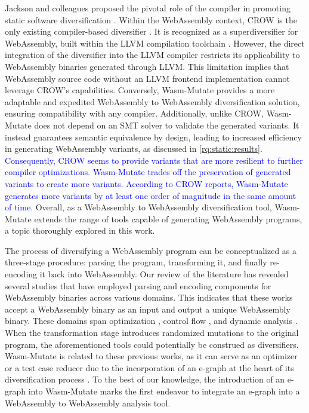 \documentclass[a4paper,fleqn]{cas-dc}
\newcommand{\tool}{{\sc Wasm-Mutate}\xspace}
\newcommand{\Wasm}{WebAssembly\xspace}
\newcommand{\wasm}{\Wasm}
\newcommand{\revision}[1]{\textcolor{blue}{#1}}
\begin{document}
Jackson and colleagues proposed the pivotal role of the compiler in promoting static software diversification \cite{jackson2011compiler}.
Within the \wasm context, CROW is the only existing compiler-based diversifier \cite{arteaga2020crow}.
It is recognized as a superdiversifier for \wasm, built within the LLVM compilation toolchain \cite{jacob2008superdiversifier}.
However, the direct integration of the diversifier into the LLVM compiler restricts its applicability to \wasm binaries generated through LLVM.
This limitation implies that \wasm source code without an LLVM frontend implementation cannot leverage CROW's capabilities.
Conversely, \tool provides a more adaptable and expedited \wasm to \wasm diversification solution, ensuring compatibility with any compiler.
Additionally, unlike CROW, \tool does not depend on an SMT solver to validate the generated variants.
It instead guarantees semantic equivalence by design, leading to increased efficiency in generating \wasm variants, as discussed in \autoref{rq:static:results}.
\revision{
Consequently, CROW seems to provide variants that are more resilient to further compiler optimizations.
\tool trades off the preservation of generated variants to create more variants.
According to CROW reports, \tool generates more variants by at least one order of magnitude in the same amount of time. 
}
Overall, as a \wasm to \wasm diversification tool, \tool extends the range of tools capable of generating \wasm programs, a topic thoroughly explored in this work.

The process of diversifying a \Wasm program can be conceptualized as a three-stage procedure: parsing the program, transforming it, and finally re-encoding it back into \wasm. 
Our review of the literature has revealed several studies that have employed parsing and encoding components for \wasm binaries across various domains. 
This indicates that these works accept a \wasm binary as an input and output a unique \wasm binary. 
These domains span optimization \cite{wasmslim}, control flow \cite{10123627}, and dynamic analysis \cite{wasabi, stievenart2020compositional, 10123627, BRITO2022102745}.
When the transformation stage introduces randomized mutations to the original program, the aforementioned tools could potentially be construed as diversifiers.
\tool is related to these previous works, as it can serve as an optimizer or a test case reducer due to the incorporation of an e-graph at the heart of its diversification process \cite{10.1145/1480881.1480915}. 
To the best of our knowledge, the introduction of an e-graph into \tool marks the first endeavor to integrate an e-graph into a \wasm to \wasm analysis tool.
\end{document}
